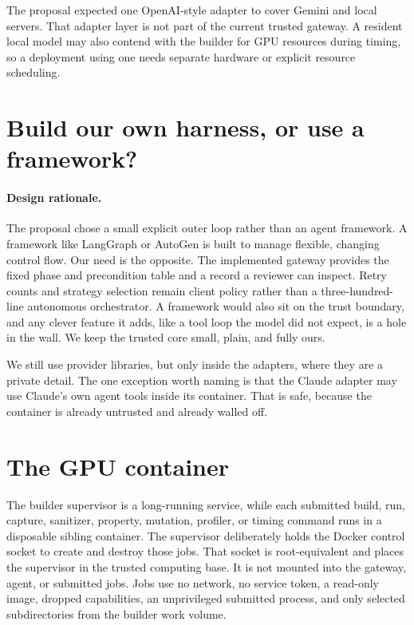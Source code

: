 \documentclass[11pt]{article}
\begin{document}
The proposal expected one OpenAI-style adapter to cover Gemini and local
servers. That adapter layer is not part of the current trusted gateway. A
resident local model may also contend with the builder for GPU resources during
timing, so a deployment using one needs separate hardware or explicit resource
scheduling.

\section{Build our own harness, or use a framework?}

\paragraph{Design rationale.}
The proposal chose a small explicit outer loop rather than an agent framework. A framework
like LangGraph or AutoGen is built to manage flexible, changing control flow. Our
need is the opposite. The implemented gateway provides the fixed phase and
precondition table and a record a reviewer can inspect. Retry counts and
strategy selection remain client policy rather than a three-hundred-line
autonomous orchestrator. A framework would also sit on the trust boundary,
and any clever feature it adds, like a tool loop the model did not expect, is a
hole in the wall. We keep the trusted core small, plain, and fully ours.

We still use provider libraries, but only inside the adapters, where they are a
private detail. The one exception worth naming is that the Claude adapter may use
Claude's own agent tools inside its container. That is safe, because the
container is already untrusted and already walled off.

\section{The GPU container}

The builder supervisor is a long-running service, while each submitted build,
run, capture, sanitizer, property, mutation, profiler, or timing command runs in
a disposable sibling container. The supervisor deliberately holds the Docker
control socket to create and destroy those jobs. That socket is root-equivalent
and places the supervisor in the trusted computing base. It is not mounted into
the gateway, agent, or submitted jobs. Jobs use no network, no service token, a
read-only image, dropped capabilities, an unprivileged submitted process, and
only selected subdirectories from the builder work volume.
\end{document}
